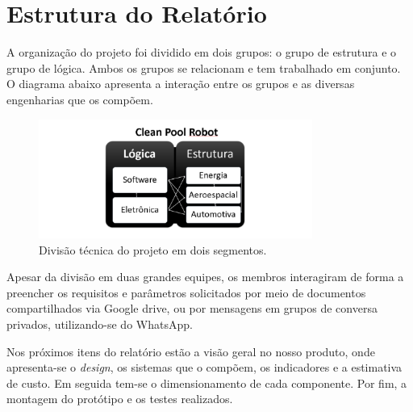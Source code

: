 \section{Estrutura do Relatório}
A organização do projeto foi dividido em dois grupos: o grupo de estrutura e o grupo de lógica. Ambos os grupos se relacionam e tem trabalhado em conjunto. O diagrama abaixo apresenta a interação entre os grupos e as diversas engenharias que os compõem.
\par
  \begin{figure}[h]
    \centering
    \includegraphics[width=0.8\textwidth]{figures/technical-div-project.png}
    \caption{Divisão técnica do projeto em dois segmentos.}
    \label{fig:technical-div-project}
  \end{figure}
  \FloatBarrier
\par
Apesar da divisão em duas grandes equipes, os membros interagiram de forma a preencher os requisitos e parâmetros solicitados por meio de documentos compartilhados via Google drive, ou por mensagens em grupos de conversa privados, utilizando-se do \textsf{WhatsApp}.

Nos próximos itens do relatório estão a visão geral no nosso produto, onde apresenta-se o \textit{design}, os sistemas que o compõem, os indicadores e a estimativa de custo. Em seguida tem-se o dimensionamento de cada componente. Por fim, a montagem do protótipo e os testes realizados.
